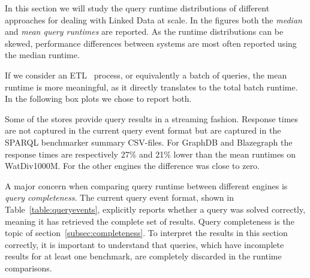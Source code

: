 
In this section we will study the query runtime distributions of different approaches for dealing with Linked Data at scale. In the figures both the \emph{median} and \emph{mean query runtimes} are reported. As the runtime distributions can be skewed, performance differences between systems are most often reported using the median runtime. 

If we consider an ETL~\cite{ETL} process, or equivalently a batch of queries, the mean runtime is more meaningful, as it directly translates to the total batch runtime. In the following box plots we chose to report both.

Some of the stores provide query results in a streaming fashion. Response times are not captured in the current query event format but are captured in the SPARQL benchmarker summary CSV-files. For GraphDB and Blazegraph the response times are respectively 27\% and 21\% lower than the mean runtimes on WatDiv1000M. For the other engines the difference was close to zero.

A major concern when comparing query runtime between different engines is \emph{query completeness}. The current query event format, shown in Table~\ref{table:queryevents}, explicitly reports whether a query was solved correctly, meaning it has retrieved the complete set of results. Query completeness is the topic of section~\ref{subsec:completeness}. To interpret the results in this section correctly, it is important to understand that queries, which have incomplete results for at least one benchmark, are completely discarded in the runtime comparisons.

